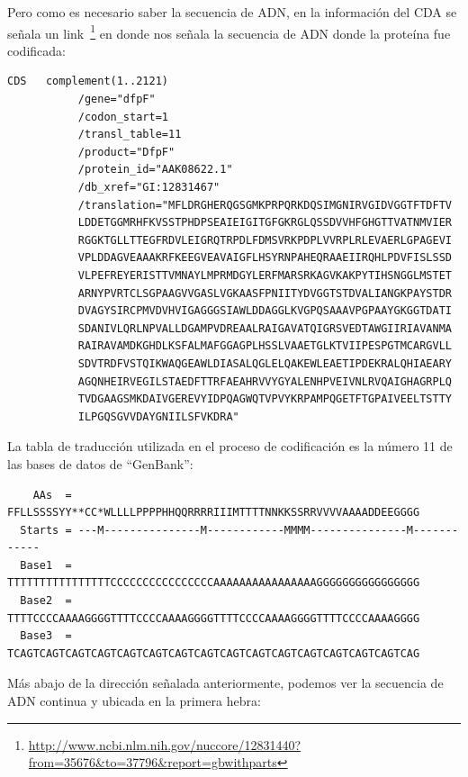 Pero como es necesario saber la secuencia de ADN,
en la información del CDA se señala un link~\footnote{\url{http://www.ncbi.nlm.nih.gov/nuccore/12831440?from=35676&to=37796&report=gbwithparts}}
en donde nos señala la secuencia de ADN donde la proteína fue codificada:

\begin{verbatim}
CDS   complement(1..2121)
           /gene="dfpF"
           /codon_start=1
           /transl_table=11
           /product="DfpF"
           /protein_id="AAK08622.1"
           /db_xref="GI:12831467"
           /translation="MFLDRGHERQGSGMKPRPQRKDQSIMGNIRVGIDVGGTFTDFTV
           LDDETGGMRHFKVSSTPHDPSEAIEIGITGFGKRGLQSSDVVHFGHGTTVATNMVIER
           RGGKTGLLTTEGFRDVLEIGRQTRPDLFDMSVRKPDPLVVRPLRLEVAERLGPAGEVI
           VPLDDAGVEAAAKRFKEEGVEAVAIGFLHSYRNPAHEQRAAEIIRQHLPDVFISLSSD
           VLPEFREYERISTTVMNAYLMPRMDGYLERFMARSRKAGVKAKPYTIHSNGGLMSTET
           ARNYPVRTCLSGPAAGVVGASLVGKAASFPNIITYDVGGTSTDVALIANGKPAYSTDR
           DVAGYSIRCPMVDVHVIGAGGGSIAWLDDAGGLKVGPQSAAAVPGPAAYGKGGTDATI
           SDANIVLQRLNPVALLDGAMPVDREAALRAIGAVATQIGRSVEDTAWGIIRIAVANMA
           RAIRAVAMDKGHDLKSFALMAFGGAGPLHSSLVAAETGLKTVIIPESPGTMCARGVLL
           SDVTRDFVSTQIKWAQGEAWLDIASALQGLELQAKEWLEAETIPDEKRALQHIAEARY
           AGQNHEIRVEGILSTAEDFTTRFAEAHRVVYGYALENHPVEIVNLRVQAIGHAGRPLQ
           TVDGAAGSMKDAIVGEREVYIDPQAGWQTVPVYKRPAMPQGETFTGPAIVEELTSTTY
           ILPGQSGVVDAYGNIILSFVKDRA"
\end{verbatim}

La tabla de traducción utilizada en el proceso de codificación es la número 11 de las bases
de datos de ``GenBank'':

\begin{verbatim}
    AAs  = FFLLSSSSYY**CC*WLLLLPPPPHHQQRRRRIIIMTTTTNNKKSSRRVVVVAAAADDEEGGGG
  Starts = ---M---------------M------------MMMM---------------M------------
  Base1  = TTTTTTTTTTTTTTTTCCCCCCCCCCCCCCCCAAAAAAAAAAAAAAAAGGGGGGGGGGGGGGGG
  Base2  = TTTTCCCCAAAAGGGGTTTTCCCCAAAAGGGGTTTTCCCCAAAAGGGGTTTTCCCCAAAAGGGG
  Base3  = TCAGTCAGTCAGTCAGTCAGTCAGTCAGTCAGTCAGTCAGTCAGTCAGTCAGTCAGTCAGTCAG
\end{verbatim}

Más abajo de la dirección señalada anteriormente,
podemos ver la secuencia de ADN continua y ubicada en la primera hebra:

